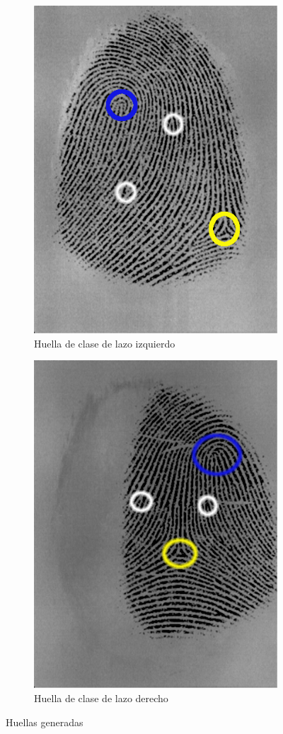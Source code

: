 \documentclass[10pt,a4paper]{article}
\begin{document}
\begin{figure}[h!]
\begin{subfigure}{.5\textwidth}
  \centering
  \includegraphics[width=.7\linewidth]{1/left_loop.png}
  \caption{Huella de clase de lazo izquierdo}
  \label{fig:left_loop}
\end{subfigure}%
\begin{subfigure}{.5\textwidth}
  \centering
  \includegraphics[width=.7\linewidth]{1/right_loop.png}
  \caption{Huella de clase de lazo derecho}
  \label{fig:right_loop}
\end{subfigure}
	\caption{Huellas generadas}
\end{figure}
\end{document}
